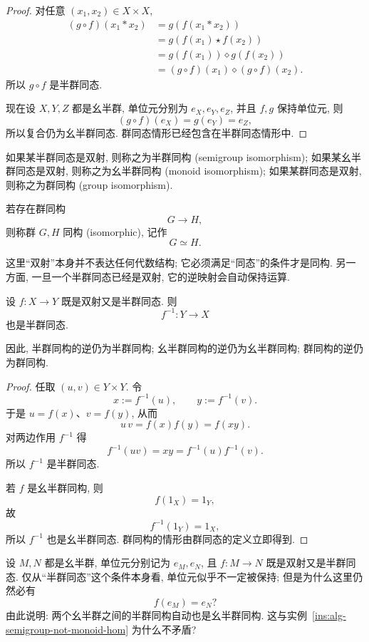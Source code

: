 \documentclass[usesamecnt, thmcnt=section, lang=cn, newtx, 10pt, scheme=chinese]{elegantbook}
\begin{document}
\begin{proof}
对任意 $(x_1,x_2)\in X\times X$,
\[
 \begin{aligned}
 (g\circ f)(x_1*x_2)
 &=g(f(x_1*x_2))\\
 &=g(f(x_1)\star f(x_2))\\
 &=g(f(x_1))\diamond g(f(x_2))\\
 &=(g\circ f)(x_1)\diamond(g\circ f)(x_2).
 \end{aligned}
\]
所以 $g\circ f$ 是半群同态.

现在设 $X,Y,Z$ 都是幺半群, 单位元分别为 $e_X,e_Y,e_Z$, 并且 $f,g$ 保持单位元, 则
\[
 (g\circ f)(e_X)=g(e_Y)=e_Z,
\]
所以复合仍为幺半群同态. 群同态情形已经包含在半群同态情形中.
\end{proof}

\begin{definition}[同构]\label{def:alg-isomorphism}
如果某半群同态是双射, 则称之为{\color{blue}半群同构 (semigroup isomorphism)}; 如果某幺半群同态是双射, 则称之为{\color{blue}幺半群同构 (monoid isomorphism)}; 如果某群同态是双射, 则称之为{\color{blue}群同构 (group isomorphism)}.

若存在群同构
\[
 G\longrightarrow H,
\]
则称群 $G,H$ {\color{blue}同构 (isomorphic)}, 记作
\[
 G\simeq H.
\]
\end{definition}

这里``双射''本身并不表达任何代数结构; 它必须满足``同态''的条件才是同构. 另一方面, 一旦一个半群同态已经是双射, 它的逆映射会自动保持运算.

\begin{proposition}\label{prop:alg-inverse-hom}
设 $f:X\to Y$ 既是双射又是半群同态. 则
\[
 f^{-1}:Y\to X
\]
也是半群同态.

因此, 半群同构的逆仍为半群同构; 幺半群同构的逆仍为幺半群同构; 群同构的逆仍为群同构.
\end{proposition}

\begin{proof}
任取 $(u,v)\in Y\times Y$. 令
\[
 x:=f^{-1}(u),\qquad y:=f^{-1}(v).
\]
于是 $u=f(x)$、$v=f(y)$, 从而
\[
 u\,v=f(x)f(y)=f(xy).
\]
对两边作用 $f^{-1}$ 得
\[
 f^{-1}(uv)=xy=f^{-1}(u)f^{-1}(v).
\]
所以 $f^{-1}$ 是半群同态.

若 $f$ 是幺半群同构, 则
\[
 f(1_X)=1_Y,
\]
故
\[
 f^{-1}(1_Y)=1_X,
\]
所以 $f^{-1}$ 也是幺半群同态. 群同构的情形由群同态的定义立即得到.
\end{proof}

\begin{concept}\label{con:alg-semigroup-iso-monoid}
设 $M,N$ 都是幺半群, 单位元分别记为 $e_M,e_N$, 且 $f:M\to N$ 既是双射又是半群同态. 仅从``半群同态''这个条件本身看, 单位元似乎不一定被保持; 但是为什么这里仍然必有
\[
 f(e_M)=e_N?
\]
由此说明: 两个幺半群之间的半群同构自动也是幺半群同构. 这与实例~\ref{ins:alg-semigroup-not-monoid-hom} 为什么不矛盾?
\end{concept}
\end{document}
